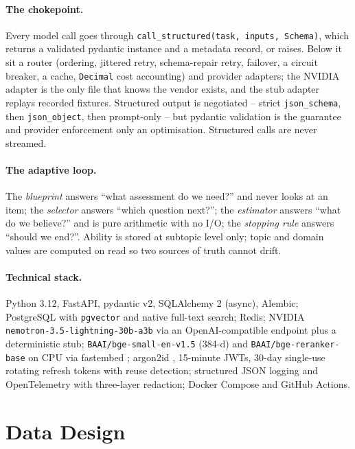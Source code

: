 \documentclass{tietreport}
\begin{document}
\paragraph{The chokepoint.} Every model call goes through \texttt{call\_structured(task,
inputs, Schema)}, which returns a validated pydantic instance and a metadata record, or raises.
Below it sit a router (ordering, jittered retry, schema-repair retry, failover, a circuit
breaker, a cache, \texttt{Decimal} cost accounting) and provider adapters; the NVIDIA adapter is
the only file that knows the vendor exists, and the stub adapter replays recorded fixtures.
Structured output is negotiated -- strict \texttt{json\_schema}, then \texttt{json\_object}, then
prompt-only -- but pydantic validation is the guarantee and provider enforcement only an
optimisation. Structured calls are never streamed.

\paragraph{The adaptive loop.} The \emph{blueprint} answers ``what assessment do we need?'' and
never looks at an item; the \emph{selector} answers ``which question next?''; the
\emph{estimator} answers ``what do we believe?'' and is pure arithmetic with no I/O; the
\emph{stopping rule} answers ``should we end?''. Ability is stored at subtopic level only;
topic and domain values are computed on read so two sources of truth cannot drift.

\paragraph{Technical stack.} Python 3.12, FastAPI, pydantic v2, SQLAlchemy 2 (async), Alembic;
PostgreSQL with \texttt{pgvector} and native full-text search; Redis; NVIDIA
\texttt{nemotron-3.5-lightning-30b-a3b} via an OpenAI-compatible endpoint plus a deterministic stub;
\texttt{BAAI/bge-small-en-v1.5} (384-d) and \texttt{BAAI/bge-reranker-base} on CPU via fastembed
\cite{xiao2023cpack}; argon2id \cite{biryukov2016argon2}, 15-minute JWTs, 30-day single-use
rotating refresh tokens with reuse detection; structured JSON logging and OpenTelemetry with
three-layer redaction; Docker Compose and GitHub Actions.

\section{Data Design}
\label{sec:data-design}
\end{document}
